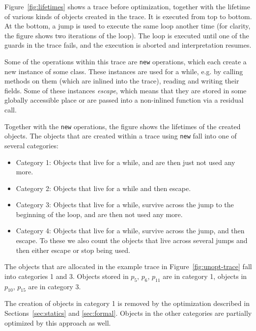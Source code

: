 \documentclass{sigplanconf}
\begin{document}
Figure~\ref{fig:lifetimes} shows a trace before optimization, together with the
lifetime of various kinds of objects created in the trace. It is executed from
top to bottom. At the bottom, a jump is used to execute the same loop another
time (for clarity, the figure shows two iterations of the loop). The loop is
executed until one of the guards in the trace fails, and the execution is
aborted and interpretation resumes.

Some of the operations within this trace are \texttt{new} operations, which each
create a new instance of some class. These instances are used for a while, e.g.
by calling methods on them (which are inlined into the trace), reading and
writing their fields. Some of these instances \emph{escape}, which means that
they are stored in some globally accessible place or are passed into a
non-inlined function via a residual call.

Together with the \texttt{new} operations, the figure shows the lifetimes of the
created objects. The objects that are created within a trace using \texttt{new}
fall into one of several categories:

\begin{itemize}
    \item Category 1: Objects that live for a while, and are then just not
    used any more.

    \item Category 2: Objects that live for a while and then escape.

    \item Category 3: Objects that live for a while, survive across the jump to
    the beginning of the loop, and are then not used any more.

    \item Category 4: Objects that live for a while, survive across the jump,
    and then escape. To these we also count the objects that live across several
    jumps and then either escape or stop being used.
\end{itemize}

The objects that are allocated in the example trace in
Figure~\ref{fig:unopt-trace} fall into categories 1 and 3. Objects stored in
$p_{5}$, $p_{6}$, $p_{11}$ are in category 1, objects in $p_{10}$, $p_{15}$ are in
category 3.

The creation of objects in category 1 is removed by the optimization described
in Sections~\ref{sec:statics} and \ref{sec:formal}. Objects in the other
categories are partially optimized by this approach as well.
\end{document}
